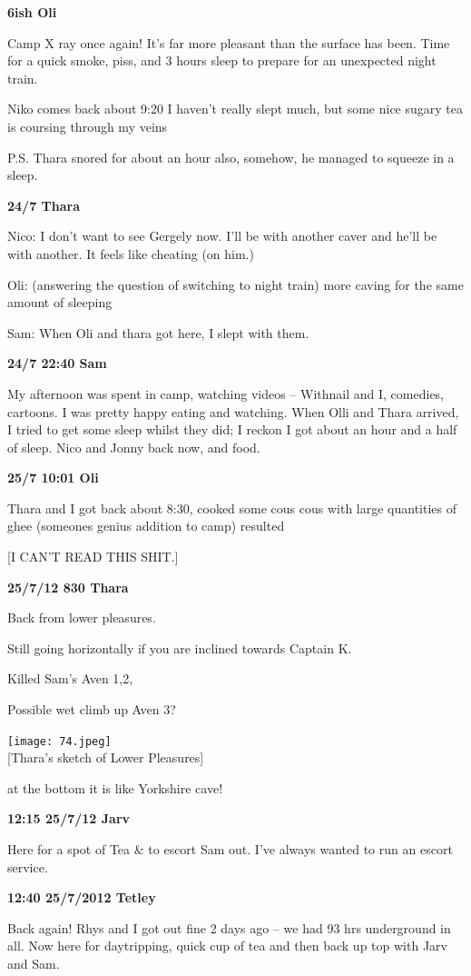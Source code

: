 \textbf{6ish Oli}

Camp X ray once again! It's far more pleasant than the surface has been.
Time for a quick smoke, piss, and 3 hours sleep to prepare for an
unexpected night train.

Niko comes back about 9:20 I haven't really slept much, but some nice
sugary tea is coursing through my veins

P.S. Thara snored for about an hour also, somehow, he managed to squeeze
in a sleep.

\textbf{24/7 Thara}

Nico: I don't want to see Gergely now. I'll be with another caver and
he'll be with another. It feels like cheating (on him.)

Oli: (answering the question of switching to night train) more caving
for the same amount of sleeping

Sam: When Oli and thara got here, I slept with them.

\textbf{24/7 22:40 Sam}

My afternoon was spent in camp, watching videos -- Withnail and I,
comedies, cartoons. I was pretty happy eating and watching. When Olli
and Thara arrived, I tried to get some sleep whilst they did; I reckon I
got about an hour and a half of sleep. Nico and Jonny back now, and
food.

\textbf{25/7 10:01 Oli}

Thara and I got back about 8:30, cooked some cous cous with large
quantities of ghee (someones genius addition to camp) resulted

{[}I CAN'T READ THIS SHIT.{]}

\textbf{25/7/12 830 Thara}

Back from lower pleasures.

Still going horizontally if you are inclined towards Captain K.

Killed Sam's Aven 1,2,

Possible wet climb up Aven 3?

\texttt{[image: 74.jpeg]}\\
{[}Thara's sketch of Lower Pleasures{]}

at the bottom it is like Yorkshire cave!

\textbf{12:15 25/7/12 Jarv}

Here for a spot of Tea \& to escort Sam out. I've always wanted to run
an escort service.

\textbf{12:40 25/7/2012 Tetley}

Back again! Rhys and I got out fine 2 days ago -- we had 93 hrs
underground in all. Now here for daytripping, quick cup of tea and then
back up top with Jarv and Sam.


